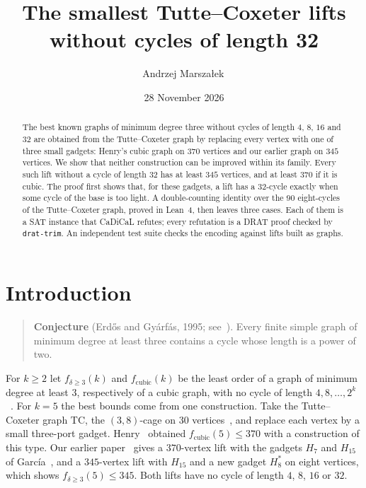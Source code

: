 \documentclass[11pt]{amsart}
\title[Tutte--Coxeter lifts without 32-cycles]{The smallest Tutte--Coxeter lifts\\ without cycles of length 32}
\author[A. Marszałek]{Andrzej Marszałek\,\orcidlink{0009-0006-6148-2965}}
\date{28 November 2026}
\theoremstyle{remark}
\newcommand{\code}[1]{\texttt{#1}}
\newcommand{\fd}{f_{\delta\ge 3}}
\newcommand{\fc}{f_{\mathrm{cubic}}}
\newcommand{\Hseven}{H_7}
\newcommand{\Hfifteen}{H_{15}}
\newcommand{\Height}{H_8^{*}}
\newcommand{\TC}{\mathrm{TC}}
\begin{document}
\begin{abstract}
The best known graphs of minimum degree three without cycles of length $4$,
$8$, $16$ and $32$ are obtained from the Tutte--Coxeter graph by replacing
every vertex with one of three small gadgets: Henry's cubic graph on $370$
vertices and our earlier graph on $345$ vertices. We show that neither
construction can be improved within its family. Every such lift without a
cycle of length $32$ has at least $345$ vertices, and at least $370$ if it is
cubic. The proof first shows that, for these gadgets, a lift has a $32$-cycle
exactly when some cycle of the base is too light. A double-counting identity
over the $90$ eight-cycles of the Tutte--Coxeter graph, proved in Lean~4, then
leaves three cases. Each of them is a SAT instance that CaDiCaL refutes; every
refutation is a DRAT proof checked by \code{drat-trim}. An independent test
suite checks the encoding against lifts built as graphs.
\end{abstract}

\maketitle

\section{Introduction}

\begin{quote}
\textbf{Conjecture} (Erdős and Gyárfás, 1995; see~\cite{Erdos1997}).
Every finite simple graph of minimum degree at least three contains a cycle
whose length is a power of two.
\end{quote}

For $k\ge 2$ let $\fd(k)$ and $\fc(k)$ be the least order of a graph of
minimum degree at least $3$, respectively of a cubic graph, with no cycle of
length $4,8,\dots,2^k$~\cite{Garcia2026,Henry2026,Marszalek2026a}. For $k=5$
the best bounds come from one construction. Take the Tutte--Coxeter graph
$\TC$, the $(3,8)$-cage on $30$ vertices~\cite{Tutte1947}, and replace each
vertex by a small three-port gadget. Henry~\cite{Henry2026} obtained
$\fc(5)\le 370$ with a construction of this type. Our earlier
paper~\cite{Marszalek2026a} gives a $370$-vertex lift with the gadgets
$\Hseven$ and $\Hfifteen$ of García~\cite{Garcia2026}, and a $345$-vertex lift
with $\Hfifteen$ and a new gadget $\Height$ on eight vertices, which shows
$\fd(5)\le 345$. Both lifts have no cycle of length $4$, $8$, $16$ or $32$.
\end{document}
